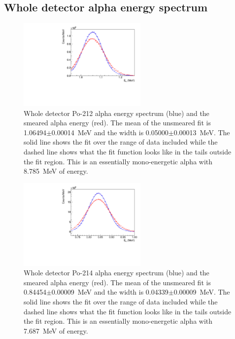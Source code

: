 \subsection{Whole detector alpha energy spectrum}
\begin{figure}[!h]
\centering
\includegraphics[width=0.56\textwidth]{figures/PubBiPo212AlphaE.pdf}
\caption{\label{fig:AlphaE212}Whole detector Po-212 alpha energy spectrum (blue) and the smeared alpha energy (red). The mean of the unsmeared fit is 1.06494$\pm$0.00014~MeV and the width is 0.05000$\pm$0.00013~MeV. The solid line shows the fit over the range of data included while the dashed line shows what the fit function looks like in the tails outside the fit region. This is an essentially mono-energetic alpha with 8.785~MeV of energy.}
\end{figure}
\begin{figure}[!h]
\centering
\includegraphics[width=0.56\textwidth]{figures/PubBiPo214AlphaE.pdf}
\caption{\label{fig:AlphaE214}Whole detector Po-214 alpha energy spectrum (blue) and the smeared alpha energy (red). The mean of the unsmeared fit is 0.84454$\pm$0.00009~MeV and the width is 0.04339$\pm$0.00009~MeV.  The solid line shows the fit over the range of data included while the dashed line shows what the fit function looks like in the tails outside the fit region. This is an essentially mono-energetic alpha with 7.687~MeV of energy.}
\end{figure}
\clearpage
\newpage
